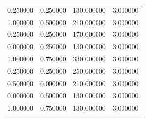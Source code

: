 \documentclass[12pt]{report}
\begin{document}
\begin{center}
\begin{table}[h!]
\begin{center}
\begin{tabular}{|llll|}
				0.250000                      & 0.250000                   & 130.000000                & 3.000000 \\
				1.000000                      & 0.500000                   & 210.000000                & 3.000000 \\
				0.250000                      & 0.250000                   & 170.000000                & 3.000000 \\
				0.000000                      & 0.250000                   & 130.000000                & 3.000000 \\
				1.000000                      & 0.750000                   & 330.000000                & 3.000000 \\
				0.250000                      & 0.250000                   & 250.000000                & 3.000000 \\
				0.500000                      & 0.000000                   & 210.000000                & 3.000000 \\
				0.000000                      & 0.500000                   & 130.000000                & 3.000000 \\
				1.000000                      & 0.750000                   & 130.000000                & 3.000000 \\ \hline
			\end{tabular}
		\end{center}
	\end{table}
	
\end{center}

\newpage
\end{document}
